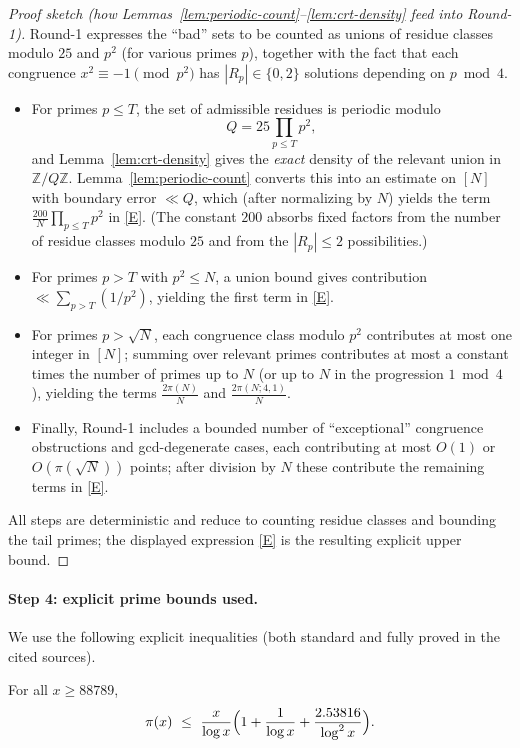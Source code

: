 \begin{proof}[Proof sketch (how Lemmas~\ref{lem:periodic-count}--\ref{lem:crt-density} feed into Round-1)]
Round-1 expresses the ``bad'' sets to be counted as unions of residue classes modulo $25$ and $p^2$ (for various primes $p$), together with the fact that each congruence $x^2\equiv -1\pmod{p^2}$ has $|R_p|\in\{0,2\}$ solutions depending on $p\bmod 4$.
\begin{itemize}
\item For primes $p\le T$, the set of admissible residues is periodic modulo
\[
Q=25\prod_{p\le T}p^2,
\]
and Lemma~\ref{lem:crt-density} gives the \emph{exact} density of the relevant union in $\mathbb Z/Q\mathbb Z$.  Lemma~\ref{lem:periodic-count} converts this into an estimate on $[N]$ with boundary error $\ll Q$, which (after normalizing by $N$) yields the term $\frac{200}{N}\prod_{p\le T}p^2$ in \eqref{E}.  (The constant $200$ absorbs fixed factors from the number of residue classes modulo $25$ and from the $|R_p|\le 2$ possibilities.)
\item For primes $p>T$ with $p^2\le N$, a union bound gives contribution $\ll \sum_{p>T} (1/p^2)$, yielding the first term in \eqref{E}.
\item For primes $p>\sqrt N$, each congruence class modulo $p^2$ contributes at most one integer in $[N]$; summing over relevant primes contributes at most a constant times the number of primes up to $N$ (or up to $N$ in the progression $1\bmod 4$), yielding the terms $\frac{2\pi(N)}{N}$ and $\frac{2\pi(N;4,1)}{N}$.
\item Finally, Round-1 includes a bounded number of ``exceptional'' congruence obstructions and gcd-degenerate cases, each contributing at most $O(1)$ or $O(\pi(\sqrt N))$ points; after division by $N$ these contribute the remaining terms in \eqref{E}.
\end{itemize}
All steps are deterministic and reduce to counting residue classes and bounding the tail primes; the displayed expression \eqref{E} is the resulting explicit upper bound.
\end{proof}

\paragraph{Step 4: explicit prime bounds used.}
We use the following explicit inequalities (both standard and fully proved in the cited sources).

\begin{lemma}\label{lem:dusart}
For all $x\ge 88789$,
\[
\pi(x)\ \le\ \frac{x}{\log x}\Bigl(1+\frac{1}{\log x}+\frac{2.53816}{\log^2 x}\Bigr).
\]
\end{lemma}

